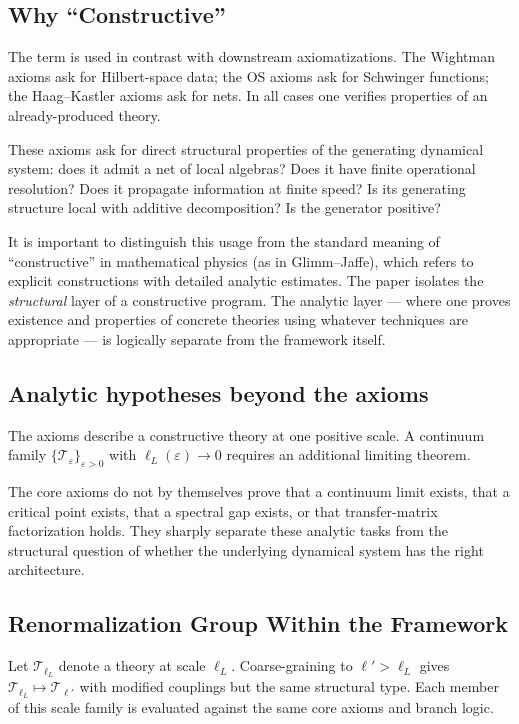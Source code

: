 \documentclass[12pt,a4paper]{article}
\theoremstyle{plain}
\theoremstyle{definition}
\theoremstyle{remark}
\begin{document}
\subsection{Why ``Constructive''}

The term is used in contrast with downstream axiomatizations. The
Wightman axioms ask for Hilbert-space data; the OS axioms ask for
Schwinger functions; the Haag--Kastler axioms ask for nets. In all
cases one verifies properties of an already-produced theory.

These axioms ask for direct structural properties of the
generating dynamical system: does it admit a net of local algebras?
Does it have finite operational resolution? Does it propagate
information at finite speed? Is its generating structure local with
additive decomposition? Is the generator positive?

It is important to distinguish this usage from the standard meaning of
``constructive'' in mathematical physics (as in Glimm--Jaffe), which
refers to explicit constructions with detailed analytic estimates. The
paper isolates the \emph{structural} layer of a constructive
program. The analytic layer --- where one proves existence and
properties of concrete theories using whatever techniques are
appropriate --- is logically separate from the framework itself.


\subsection{Analytic hypotheses beyond the axioms}

The axioms describe a constructive theory at one positive scale. A
continuum family $\{\mathcal{T}_\varepsilon\}_{\varepsilon > 0}$ with
$\ell_L(\varepsilon) \to 0$ requires an additional limiting theorem.

The core axioms do not by themselves prove that a continuum limit
exists, that a critical point exists, that a spectral gap exists, or
that transfer-matrix factorization holds. They sharply separate these
analytic tasks from the structural question of whether the underlying
dynamical system has the right architecture.


\subsection{Renormalization Group Within the Framework}

Let $\mathcal{T}_{\ell_L}$ denote a theory at scale $\ell_L$.
Coarse-graining to $\ell' > \ell_L$ gives
$\mathcal{T}_{\ell_L} \mapsto \mathcal{T}_{\ell'}$ with modified
couplings but the same structural type. Each member of this scale
family is evaluated against the same core axioms and branch logic.
\end{document}
